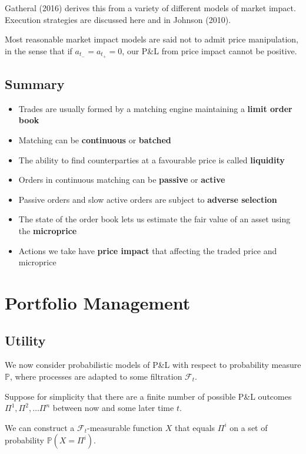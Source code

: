 \documentclass{article}
\newcommand{\sectionquote}[1]{\def\insertsquote{#1}}
\newcommand{\insertsquote}{}
\renewcommand{\insertsquote}{}%
\begin{document}
Gatheral (2016) derives this from a variety of different models of market impact. Execution strategies are discussed here and in Johnson (2010).

Most reasonable market impact models are said not to admit price manipulation, in the sense that if $a_{t_-}=a_{t_+}=0$, our P\&L from price impact cannot be positive.

\subsection{Summary}
\begin{itemize}
	\item Trades are usually formed by a matching engine maintaining a \textbf{limit order book}
	\item Matching can be \textbf{continuous} or \textbf{batched}
	\item The ability to find counterparties at a favourable price is called \textbf{liquidity}
	\item Orders in continuous matching can be \textbf{passive} or \textbf{active}
	\item Passive orders and slow active orders are subject to \textbf{adverse selection}
	\item The state of the order book lets us estimate the fair value of an asset using the \textbf{microprice}
	\item Actions we take have \textbf{price impact} that affecting the traded price and microprice
\end{itemize}

\sectionquote{``Cars have brakes so you can drive faster.'' Ben Rady}
\section{Portfolio Management}
\subsection{Utility}
We now consider probabilistic models of P\&L with respect to probability measure $\mathbb{P}$, where processes are adapted to some filtration $\mathcal{F}_t$.

Suppose for simplicity that there are a finite number of possible P\&L outcomes $\Pi^1,\Pi^2,\ldots\Pi^n$ between now and some later time $t$.

We can construct a $\mathcal{F}_t$-measurable function $X$ that equals $\Pi^i$ on a set of probability $\mathbb{P}(X=\Pi^i)$.%
\end{document}
